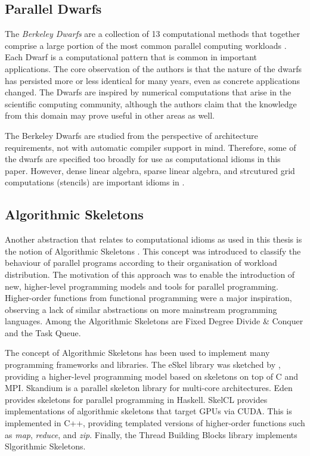 \subsection{Parallel Dwarfs}

    The {\it Berkeley Dwarfs} are a collection of 13 computational methods
    that together comprise a large portion of the most common parallel computing
    workloads \citep{Asanovic06thelandscape}.
    Each Dwarf is a computational pattern that is common in important
    applications.
    The core observation of the authors is that the nature of the dwarfs has
    persisted more or less identical for many years, even as concrete
    applications changed.
    The Dwarfs are inspired by numerical computations that arise in the
    scientific computing community, although the authors claim that the
    knowledge from this domain may prove useful in other areas as well.

    The Berkeley Dwarfs are studied from the perspective of architecture
    requirements, not with automatic compiler support in mind.
    Therefore, some of the dwarfs are specified too broadly for use as
    computational idioms in this paper.
    However, dense linear algebra, sparse linear algebra, and strcutured grid
    computations (stencils) are important idioms in .

\subsection{Algorithmic Skeletons}

    Another abstraction that relates to computational idioms as used in this
    thesis is the notion of Algorithmic Skeletons \citep{Cole1991Algorithmic}.
    This concept was introduced to classify the behaviour of parallel programs
    according to their organisation of workload distribution.
    The motivation of this approach was to enable the introduction of new,
    higher-level programming models and tools for parallel programming.
    Higher-order functions from functional programming were a major inspiration,
    observing a lack of similar abstractions on more mainstream programming
    languages.
    Among the Algorithmic Skeletons are Fixed Degree Divide \& Conquer and the
    Task Queue.

    The concept of Algorithmic Skeletons has been used to implement many
    programming frameworks and libraries.
    The eSkel library was sketched by \citet{Cole2004Bringing}, providing a
    higher-level programming model based on skeletons on top of C and MPI.
    Skandium \citep{Leyton2010Skandium} is a parallel skeleton library for
    multi-core architectures.
    Eden \citep{Loogen2005Parallel} provides skeletons for parallel programming
    in Haskell.
    SkelCL \citep{Steuwer2011SkelCL} provides implementations of algorithmic
    skeletons that target GPUs via CUDA.
    This is implemented in C++, providing templated versions of higher-order
    functions such as {\it map}, {\it reduce}, and {\it zip}.
    Finally, the Thread Building Blocks library
    \citep{Reinders2007Intel} implements Slgorithmic Skeletons.

